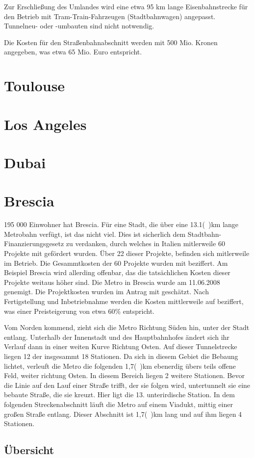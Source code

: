 Zur Erschließung des Umlandes wird eine etwa 95 km lange Eisenbahnstrecke für
den Betrieb mit Tram-Train-Fahrzeugen (Stadtbahnwagen) angepasst. Tunnelneu-
oder -umbauten sind nicht notwendig.

Die Kosten für den Straßenbahnabschnitt werden mit 500 Mio. Kronen angegeben,
was etwa 65 Mio.  Euro entspricht.

\section{Toulouse}


\section{Los Angeles}


\section{Dubai}


\section{Brescia} 

195 000 Einwohner hat Brescia. Für eine Stadt, die über eine 13.1(\ )km lange Metrobahn verfügt, ist das nicht viel. Dies ist sicherlich dem Stadtbahn-Finanzierungsgesetz zu verdanken, durch welches in Italien mitlerweile 60 Projekte mit  gefördert wurden. Über 22 dieser Projekte, befinden sich mitlerweile im Betrieb. Die Gesammtkosten der 60 Projekte wurden mit  beziffert. Am Beispiel Brescia wird allerding offenbar, das die tatsächlichen Kosten dieser Projekte weitaus höher sind. Die Metro in Brescia wurde am 11.06.2008 genemigt. Die Projektkosten wurden im Antrag mit  geschätzt.\cite{brescSv} Nach Fertigstellung und Inbetriebnahme werden die Kosten mittlerweile auf  beziffert, was einer Preisteigerung von etwa 60\% entspricht\cite{brescRai}.  

Vom Norden kommend, zieht sich die Metro Richtung Süden hin, unter der Stadt entlang. Unterhalb der Innenstadt und des Hauptbahnhofes ändert sich ihr Verlauf dann in einer weiten Kurve Richtung Osten. Auf dieser Tunnelstrecke liegen 12 der insgesammt 18 Stationen. Da sich in diesem Gebiet die Bebaung lichtet, verleuft die Metro die folgenden 1,7(\ )km ebenerdig übers teils offene Feld, weiter richtung Osten. In diesem Bereich liegen 2 weitere Stationen. Bevor die Linie auf den Lauf einer Straße trifft, der sie folgen wird, untertunnelt sie eine bebaute Straße, die sie kreuzt. Hier ligt die 13. unterirdische Station. In dem folgenden Streckenabschnitt läuft die Metro auf einem Viadukt, mittig einer großen Straße entlang. Dieser Abschnitt ist 1,7(\ )km lang und auf ihm liegen 4 Stationen.\cite{brescSts}


\begin{landscape}
\section{Übersicht}

\end{landscape}

